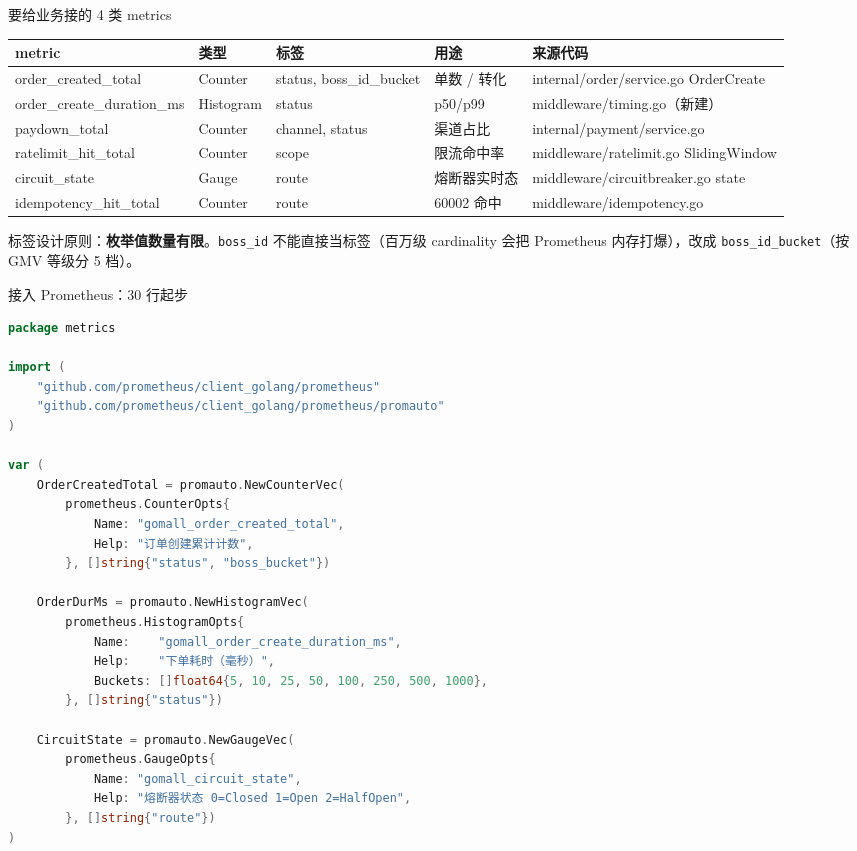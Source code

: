 \documentclass[aspectratio=169,11pt]{beamer}
\begin{document}
\begin{frame}[shrink]{要给业务接的 4 类 metrics}
\scriptsize
\begin{tabular}{@{}lllll@{}}
\toprule
metric & 类型 & 标签 & 用途 & 来源代码 \\
\midrule
order\_created\_total       & Counter   & status, boss\_id\_bucket  & 单数 / 转化 & internal/order/service.go OrderCreate \\
order\_create\_duration\_ms & Histogram & status                    & p50/p99 & middleware/timing.go（新建） \\
paydown\_total              & Counter   & channel, status           & 渠道占比 & internal/payment/service.go \\
ratelimit\_hit\_total       & Counter   & scope                     & 限流命中率 & middleware/ratelimit.go SlidingWindow \\
circuit\_state              & Gauge     & route                     & 熔断器实时态 & middleware/circuitbreaker.go state \\
idempotency\_hit\_total     & Counter   & route                     & 60002 命中 & middleware/idempotency.go \\
\bottomrule
\end{tabular}
\vspace{2mm}
\small 标签设计原则：\textbf{枚举值数量有限}。\texttt{boss\_id} 不能直接当标签（百万级 cardinality 会把 Prometheus 内存打爆），改成 \texttt{boss\_id\_bucket}（按 GMV 等级分 5 档）。
\end{frame}

\begin{frame}{接入 Prometheus：30 行起步}
\begin{lstlisting}[language=Go,firstnumber=1,
  caption={}]
package metrics

import (
    "github.com/prometheus/client_golang/prometheus"
    "github.com/prometheus/client_golang/prometheus/promauto"
)

var (
    OrderCreatedTotal = promauto.NewCounterVec(
        prometheus.CounterOpts{
            Name: "gomall_order_created_total",
            Help: "订单创建累计计数",
        }, []string{"status", "boss_bucket"})

    OrderDurMs = promauto.NewHistogramVec(
        prometheus.HistogramOpts{
            Name:    "gomall_order_create_duration_ms",
            Help:    "下单耗时（毫秒）",
            Buckets: []float64{5, 10, 25, 50, 100, 250, 500, 1000},
        }, []string{"status"})

    CircuitState = promauto.NewGaugeVec(
        prometheus.GaugeOpts{
            Name: "gomall_circuit_state",
            Help: "熔断器状态 0=Closed 1=Open 2=HalfOpen",
        }, []string{"route"})
)
\end{lstlisting}
\end{frame}
\end{document}
